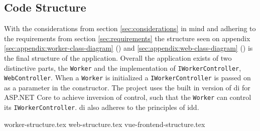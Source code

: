 \documentclass{article}
\begin{document}
\subsection{Code Structure}
With the considerations from section \ref{sec:considerations} in mind and adhering to the requirements from section \ref{sec:requirements} the structure seen on appendix \ref{sec:appendix:worker-class-diagram} () and \ref{sec:appendix:web-class-diagram} () is the final structure of the application. Overall the application exists of two distinctive parts, the \texttt{Worker} and the implementation of \texttt{IWorkerController}, \texttt{WebController}. When a \texttt{Worker} is initialized a \texttt{IWorkerController} is passed on as a parameter in the constructor. The project uses the built in version of \gls{di}\cite{url:implementation:microsoft:dependency-injection} for ASP.NET Core to achieve inversion of control, such that the \texttt{Worker} can control its \texttt{IWorkerController}. \gls{di} also adheres to the principles of \gls{idd}.

{worker-structure.tex}
{web-structure.tex}
{vue-frontend-structure.tex}
\end{document}
